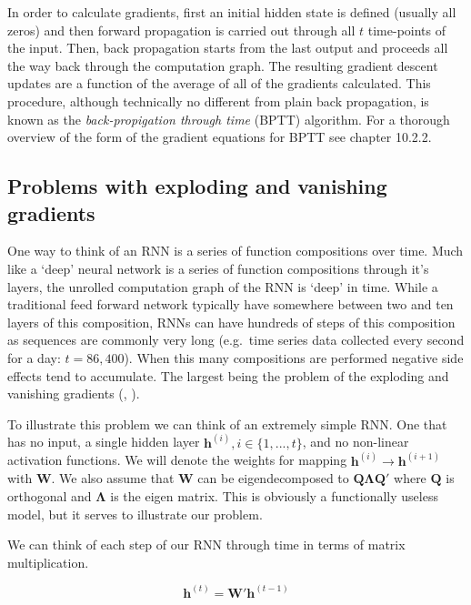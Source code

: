 \documentclass[]{book}
\theoremstyle{definition}
\theoremstyle{definition}
\theoremstyle{definition}
\theoremstyle{remark}
\begin{document}
In order to calculate gradients, first an initial hidden state is
defined (usually all zeros) and then forward propagation is carried out
through all \(t\) time-points of the input. Then, back propagation
starts from the last output and proceeds all the way back through the
computation graph. The resulting gradient descent updates are a function
of the average of all of the gradients calculated. This procedure,
although technically no different from plain back propagation, is known
as the \emph{back-propigation through time} (BPTT) algorithm. For a
thorough overview of the form of the gradient equations for BPTT see
\citet{goodfellow_DL} chapter 10.2.2.

\subsection{Problems with exploding and vanishing
gradients}\label{problems-with-exploding-and-vanishing-gradients}

One way to think of an RNN is a series of function compositions over
time. Much like a `deep' neural network is a series of function
compositions through it's layers, the unrolled computation graph of the
RNN is `deep' in time. While a traditional feed forward network
typically have somewhere between two and ten layers of this composition,
RNNs can have hundreds of steps of this composition as sequences are
commonly very long (e.g.~time series data collected every second for a
day: \(t= 86,400\)). When this many compositions are performed negative
side effects tend to accumulate. The largest being the problem of the
exploding and vanishing gradients (\citet{vanishing_gradient},
\citet{bengio_gradient}).

To illustrate this problem we can think of an extremely simple RNN. One
that has no input, a single hidden layer
\(\mathbf{h}^{(i)}, i \in \{1, ..., t\}\), and no non-linear activation
functions. We will denote the weights for mapping
\(\mathbf{h}^{(i)} \to \mathbf{h}^{(i + 1)}\) with \(\mathbf{W}\). We
also assume that \(\mathbf{W}\) can be eigendecomposed to
\(\mathbf{Q}\mathbf{\Lambda}\mathbf{Q}'\) where \(\mathbf{Q}\) is
orthogonal and \(\mathbf{\Lambda}\) is the eigen matrix. This is
obviously a functionally useless model, but it serves to illustrate our
problem.

We can think of each step of our RNN through time in terms of matrix
multiplication.

\begin{equation} 
  \mathbf{h}^{(t)} = \mathbf{W}' \mathbf{h}^{(t - 1)}
  \label{eq:simplernn1}
\end{equation}
\end{document}
